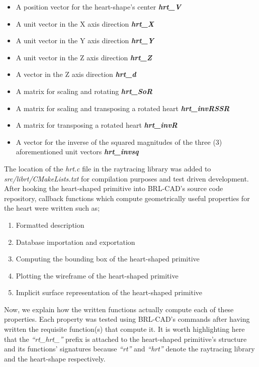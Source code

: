 \begin{itemize}
\item A position vector for the heart-shape's center \textbf{\textit{hrt\_V}}  
\item A unit vector in the X ­axis direction \textbf{\textit{hrt\_X}}  
\item A unit vector in the Y axis direction \textbf{\textit{hrt\_Y}}  
\item A unit vector in the Z axis direction \textbf{\textit{hrt\_Z}}  
\item A vector in the Z ­axis direction \textit{\textbf{hrt\_d}}  
\item A matrix for scaling and rotating \textit{\textbf{hrt\_SoR}}  
\item A matrix for scaling and transposing a rotated heart \textbf{\textit{hrt\_invRSSR}}  
\item A matrix for transposing a rotated heart \textit{\textbf{hrt\_invR}}  
\item A vector for the inverse of the squared magnitudes of the three (3) aforementioned unit vectors \textit{\textbf{hrt\_invsq}}  
\end{itemize}

The   location   of   the   \textit{hrt.c}   file   in   the   raytracing   library   was   added   to  
\textit{src/librt/CMakeLists.txt} for compilation purposes  and test ­driven development.\\
   
\hspace{30} After   hooking   the   heart-­shaped   primitive   into   BRL-­CAD's   source   code  
repository,  callback functions which compute geometrically useful properties for the heart were written such as;  
 
\begin{enumerate}
\item Formatted description  
\item Database importation and exportation  
\item Computing the bounding box of the heart­-shaped primitive  
\item Plotting the wireframe of the heart­-shaped primitive  
\item Implicit surface representation of the heart-­shaped primitive
\end{enumerate}

\hspace{30} Now, we explain how the written functions actually compute each of these properties.
 Each   property   was   tested   using   BRL-­CAD's   commands \cite{36}   after  having   
written   the   requisite   function(s)   that   compute   it.   It   is   worth   highlighting  
here   that   the   \textit{“rt\_hrt\_”}   prefix   is   attached   to   the   heart­-shaped   primitive's   structure  
and   its   functions'   signatures   because   \textit{“rt”}   and   \textit{“hrt”}   denote   the   raytracing   library  
and the heart-shape respectively.  

